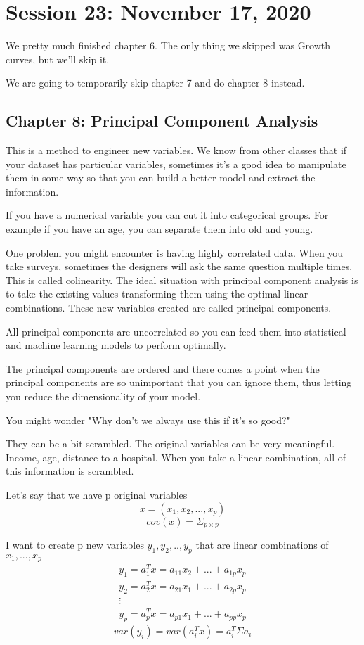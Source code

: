 \chapter{Session 23: November 17, 2020}

We pretty much finished chapter 6. The only thing we skipped was Growth curves, but we'll skip it.

We are going to temporarily skip chapter 7 and do chapter 8 instead.

\section{Chapter 8: Principal Component Analysis}

This is a method to engineer new variables. We know from other classes that if your dataset has particular variables, sometimes it's a good idea to manipulate them in some way so that you can build a better model and extract the information.

If you have a numerical variable you can cut it into categorical groups. For example if you have an age, you can separate them into old and young.

One problem you might encounter is having highly correlated data. When you take surveys, sometimes the designers will ask the same question multiple times. This is called colinearity. The ideal situation with principal component analysis is to take the existing values transforming them using the optimal linear combinations. These new variables created are called principal components.

All principal components are uncorrelated so you can feed them into statistical and machine learning models to perform optimally.

The principal components are ordered and there comes a point when the principal components are so unimportant that you can ignore them, thus letting you reduce the dimensionality of your model.


You might wonder "Why don't we always use this if it's so good?" 

They can be a bit scrambled. The original variables can be very meaningful. Income, age, distance to a hospital. When you take a linear combination, all of this information is scrambled. 

Let's say that we have p original variables
 \[x = (x_1,x_2,...,x_p)\]
 \[cov(x) = \Sigma_{p\times p}\]
 
 I want to create p new variables \(y_1,y_2,..,y_p\) that are linear combinations of \(x_1,...,x_p\)
 \begin{gather*}
     y_1 = a_1^Tx= a_{11}x_2+...+a_{1p}x_p\\
     y_2 = a_2^Tx= a_{21}x_1+...+a_{2p}x_p\\
     \vdots
     \\
     y_p = a_p^Tx= a_{p1}x_1+...+a_{pp}x_p
 \end{gather*}
 \[var(y_i) = var(a^T_ix)=a_i^T\Sigma a_i\]
 
